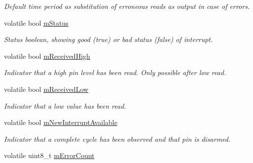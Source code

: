 \begin{DoxyCompactItemize}
\begin{DoxyCompactList}\small\item\em Default time period as substitution of erroneous reads as output in case of errors. \end{DoxyCompactList}\item 
volatile bool \hyperlink{classSPMB_1_1InterruptInput_a0221d38d44c3a9dc32a7d33d217d8e59}{m\+Status}\hypertarget{classSPMB_1_1InterruptInput_a0221d38d44c3a9dc32a7d33d217d8e59}{}\label{classSPMB_1_1InterruptInput_a0221d38d44c3a9dc32a7d33d217d8e59}

\begin{DoxyCompactList}\small\item\em Status boolean, showing good (true) or bad status (false) of interrupt. \end{DoxyCompactList}\item 
volatile bool \hyperlink{classSPMB_1_1InterruptInput_aeb0a16f69fd343042fed1d56abb44d2d}{m\+Received\+High}\hypertarget{classSPMB_1_1InterruptInput_aeb0a16f69fd343042fed1d56abb44d2d}{}\label{classSPMB_1_1InterruptInput_aeb0a16f69fd343042fed1d56abb44d2d}

\begin{DoxyCompactList}\small\item\em Indicator that a high pin level has been read. Only possible after low read. \end{DoxyCompactList}\item 
volatile bool \hyperlink{classSPMB_1_1InterruptInput_aab7e3304495e1ee98d812157368091e5}{m\+Received\+Low}\hypertarget{classSPMB_1_1InterruptInput_aab7e3304495e1ee98d812157368091e5}{}\label{classSPMB_1_1InterruptInput_aab7e3304495e1ee98d812157368091e5}

\begin{DoxyCompactList}\small\item\em Indicator that a low value has been read. \end{DoxyCompactList}\item 
volatile bool \hyperlink{classSPMB_1_1InterruptInput_a6824c0d5fae32571df02ea13aa2f8802}{m\+New\+Interrupt\+Available}\hypertarget{classSPMB_1_1InterruptInput_a6824c0d5fae32571df02ea13aa2f8802}{}\label{classSPMB_1_1InterruptInput_a6824c0d5fae32571df02ea13aa2f8802}

\begin{DoxyCompactList}\small\item\em Indicator that a complete cycle has been observed and that pin is disarmed. \end{DoxyCompactList}\item 
volatile uint8\+\_\+t \hyperlink{classSPMB_1_1InterruptInput_a76da8c6e70323bdfd0219f63e23529e8}{m\+Error\+Count}\hypertarget{classSPMB_1_1InterruptInput_a76da8c6e70323bdfd0219f63e23529e8}{}\label{classSPMB_1_1InterruptInput_a76da8c6e70323bdfd0219f63e23529e8}


\end{DoxyCompactItemize}
